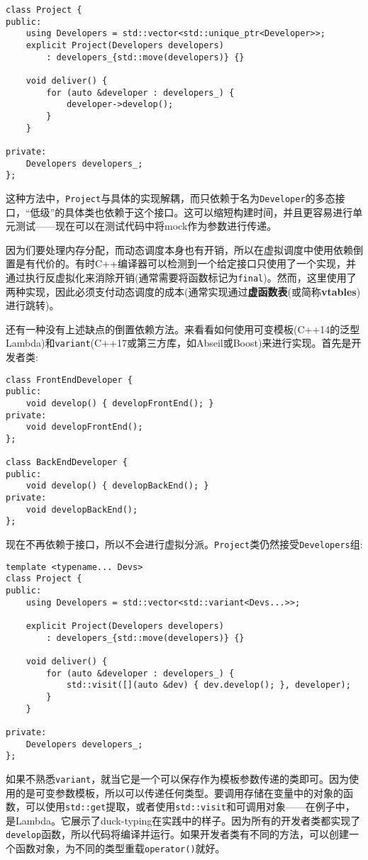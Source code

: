 \begin{lstlisting}[style=styleCXX]
class Project {
public:
	using Developers = std::vector<std::unique_ptr<Developer>>;
	explicit Project(Developers developers)
		: developers_{std::move(developers)} {}
		
	void deliver() {
		for (auto &developer : developers_) {
			developer->develop();
		}
	}

private:
	Developers developers_;
};
\end{lstlisting}

这种方法中，\texttt{Project}与具体的实现解耦，而只依赖于名为\texttt{Developer}的多态接口，“低级”的具体类也依赖于这个接口。这可以缩短构建时间，并且更容易进行单元测试——现在可以在测试代码中将mock作为参数进行传递。

因为们要处理内存分配，而动态调度本身也有开销，所以在虚拟调度中使用依赖倒置是有代价的。有时C++编译器可以检测到一个给定接口只使用了一个实现，并通过执行反虚拟化来消除开销(通常需要将函数标记为\texttt{final})。然而，这里使用了两种实现，因此必须支付动态调度的成本(通常实现通过\textbf{虚函数表}(或简称\textbf{vtables})进行跳转)。

还有一种没有上述缺点的倒置依赖方法。来看看如何使用可变模板(C++14的泛型Lambda)和\texttt{variant}(C++17或第三方库，如Abseil或Boost)来进行实现。首先是开发者类:


\begin{lstlisting}[style=styleCXX]
class FrontEndDeveloper {
public:
	void develop() { developFrontEnd(); }
private:
	void developFrontEnd();
};

class BackEndDeveloper {
public:
	void develop() { developBackEnd(); }
private:
	void developBackEnd();
};
\end{lstlisting}

现在不再依赖于接口，所以不会进行虚拟分派。\texttt{Project}类仍然接受\texttt{Developers}组:

\begin{lstlisting}[style=styleCXX]
template <typename... Devs>
class Project {
public:
	using Developers = std::vector<std::variant<Devs...>>;
	
	explicit Project(Developers developers)
		: developers_{std::move(developers)} {}
	
	void deliver() {
		for (auto &developer : developers_) {
			std::visit([](auto &dev) { dev.develop(); }, developer);
		}
	}

private:
	Developers developers_;
};
\end{lstlisting}

如果不熟悉\texttt{variant}，就当它是一个可以保存作为模板参数传递的类即可。因为使用的是可变参数模板，所以可以传递任何类型。要调用存储在变量中的对象的函数，可以使用\texttt{std::get}提取，或者使用\texttt{std::visit}和可调用对象——在例子中，是Lambda。它展示了duck-typing在实践中的样子。因为所有的开发者类都实现了\texttt{develop}函数，所以代码将编译并运行。如果开发者类有不同的方法，可以创建一个函数对象，为不同的类型重载\texttt{operator()}就好。

